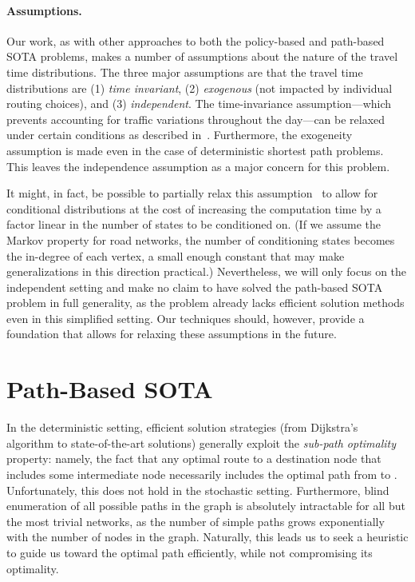 \documentclass[oribibl]{llncs}
\begin{document}
		\paragraph{Assumptions.}
		Our work, as with other approaches to both the policy-based and path-based SOTA problems,
		makes a number of assumptions about the nature of the travel time distributions.
		The three major assumptions are that the travel time distributions are
		(1) \textit{time invariant},
		(2) \textit{exogenous} (not impacted by individual routing choices), and
		(3) \textit{independent}.
		The time-invariance assumption---which prevents accounting for traffic variations throughout the
		day---can be relaxed under certain conditions as described in~\cite{samaranayake2012tractable}.
		Furthermore, the exogeneity assumption is made even in the case of deterministic shortest path problems.
		This leaves the independence assumption as a major concern for this problem.

		It might, in fact, be possible to partially relax this assumption~\citep{samaranayake2012tractable}
		to allow for conditional distributions at the cost of
		increasing the computation time by a factor linear in the number of states to be conditioned on.
		(If we assume the Markov property for road networks,
		the number of conditioning states becomes the in-degree of each vertex,
		a small enough constant that may make generalizations in this direction practical.)
		Nevertheless, we will only focus on the independent setting and make no claim to have
		solved the path-based SOTA problem in full generality,
		as the problem already lacks efficient solution methods even in this simplified setting.
		Our techniques should, however, provide a foundation that allows for
		relaxing these assumptions in the future.

	\section{Path-Based SOTA}

			In the deterministic setting, efficient solution strategies (from Dijkstra's
			algorithm to state-of-the-art solutions) generally exploit the \textit{sub-path optimality} property:
			namely, the fact that any optimal route to a destination node  that includes some intermediate node 
			necessarily includes the optimal path from  to .
			Unfortunately, this does not hold in the stochastic setting.
			Furthermore, blind enumeration of all possible paths in the graph is
			absolutely intractable for all but the most trivial networks,
			as the number of simple paths grows exponentially with the number of nodes in the graph.
			Naturally, this leads us to seek a heuristic to guide us toward the optimal path
			efficiently, while not compromising its optimality.
\end{document}
